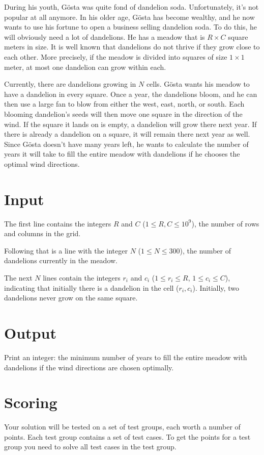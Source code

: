 \noindent
During his youth, Gösta was quite fond of dandelion soda. 
Unfortunately, it's not popular at all anymore. 
In his older age, Gösta has become wealthy, and he now wants to use his fortune to open a business selling dandelion soda. 
To do this, he will obviously need a lot of dandelions. He has a meadow that is $R \times C$ square meters in size. 
It is well known that dandelions do not thrive if they grow close to each other. 
More precisely, if the meadow is divided into squares of size $1 \times 1$ meter, at most one dandelion can grow within each.

Currently, there are dandelions growing in $N$ cells. 
Gösta wants his meadow to have a dandelion in every square. 
Once a year, the dandelions bloom, and he can then use a large fan to blow from either the west, east, north, or south. 
Each blooming dandelion's seeds will then move one square in the direction of the wind. 
If the square it lands on is empty, a dandelion will grow there next year. 
If there is already a dandelion on a square, it will remain there next year as well. 
Since Gösta doesn't have many years left, he wants to calculate the number of years it will take to fill the entire meadow with dandelions if he chooses the optimal wind directions.


\section*{Input}
\noindent
The first line contains the integers $R$ and $C$ ($1 \leq R,C \leq 10^9$), the number of rows and columns in the grid.

Following that is a line with the integer $N$ ($1 \leq N \leq 300$), the number of dandelions currently in the meadow.

The next $N$ lines contain the integers $r_i$ and $c_i$ ($1 \leq r_i \leq R$, $1 \leq c_i \leq C$), 
indicating that initially there is a dandelion in the cell ($r_i, c_i$). Initially, two dandelions never grow on the same square.

\section*{Output}
\noindent
Print an integer: the minimum number of years to fill the entire meadow with dandelions if the wind directions are chosen optimally.

\section*{Scoring}
Your solution will be tested on a set of test groups, each worth a number of points. 
Each test group contains a set of test cases. 
To get the points for a test group you need to solve all test cases in the test group.

